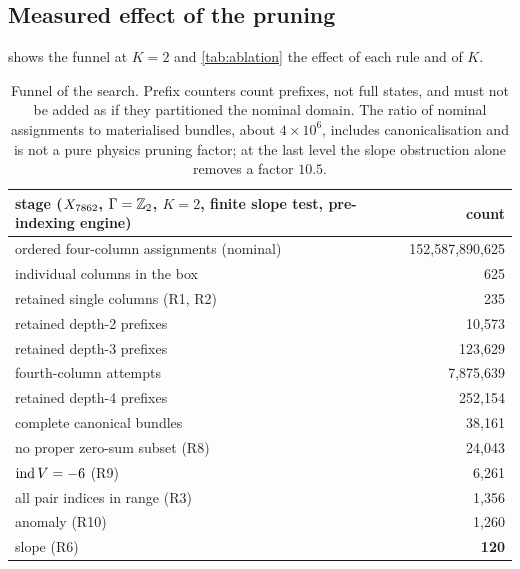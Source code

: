 \subsection{Measured effect of the pruning}

 shows the funnel at $K=2$ and \cref{tab:ablation} the effect
of each rule and of $K$.

\begin{table}[t]
\centering\small
\begin{tabular}{@{}lr@{}}
\toprule
stage ($X_{7862}$, $\Gamma=\mathbb{Z}_2$, $K=2$, finite slope test, pre-indexing engine) & count \\
\midrule
ordered four-column assignments (nominal) & 152,587,890,625 \\
individual columns in the box & 625 \\
retained single columns (R1, R2) & 235 \\
retained depth-2 prefixes & 10,573 \\
retained depth-3 prefixes & 123,629 \\
fourth-column attempts & 7,875,639 \\
retained depth-4 prefixes & 252,154 \\
complete canonical bundles & 38,161 \\
\quad no proper zero-sum subset (R8) & 24,043 \\
\quad $\operatorname{ind} V=-6$ (R9) & 6,261 \\
\quad all pair indices in range (R3) & 1,356 \\
\quad anomaly (R10) & 1,260 \\
\quad slope (R6) & \textbf{120} \\
\bottomrule
\end{tabular}
\caption{Funnel of the search. Prefix counters count prefixes, not full states,
and must not be added as if they partitioned the nominal domain. The ratio of
nominal assignments to materialised bundles, about $4\times10^6$, includes
canonicalisation and is not a pure physics pruning factor; at the last level the
slope obstruction alone removes a factor $10.5$.}
\label{tab:funnel}
\end{table}

